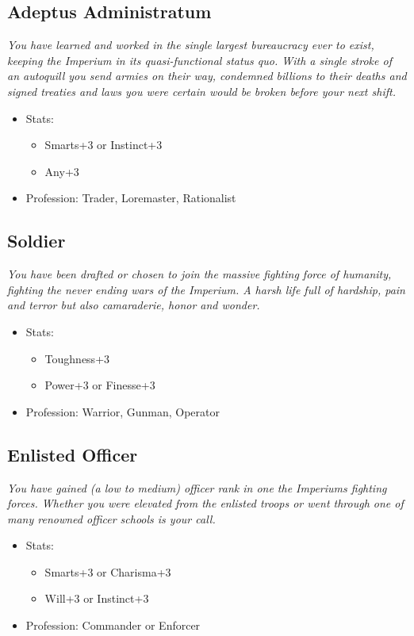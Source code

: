 	\subsection{Adeptus Administratum}
	\textit{You have learned and worked in the single largest bureaucracy ever to exist, keeping the Imperium in its quasi-functional status quo. With a single stroke of an autoquill you send armies on their way, condemned billions to their deaths and signed treaties and laws you were certain would be broken before your next shift.}
	\begin{itemize}
		\item Stats:
		\begin{itemize}
			\item Smarts+3 or Instinct+3
			\item Any+3
		\end{itemize}
		\item Profession: Trader, Loremaster, Rationalist
	\end{itemize}

	\subsection{Soldier}
	\textit{You have been drafted or chosen to join the massive fighting force of humanity, fighting the never ending wars of the Imperium. A harsh life full of hardship, pain and terror but also camaraderie, honor and wonder. }
	\begin{itemize}
		\item Stats:
		\begin{itemize}
			\item Toughness+3
			\item Power+3 or Finesse+3
		\end{itemize}
		\item Profession: Warrior, Gunman, Operator
	\end{itemize}

	\subsection{Enlisted Officer}
	\textit{You have gained (a low to medium) officer rank in one the Imperiums fighting forces. Whether you were elevated from the enlisted troops or went through one of many renowned officer schools is your call.}
	\begin{itemize}
		\item Stats:
		\begin{itemize}
			\item Smarts+3 or Charisma+3
			\item Will+3 or Instinct+3
		\end{itemize}
		\item Profession: Commander or Enforcer
	\end{itemize}

